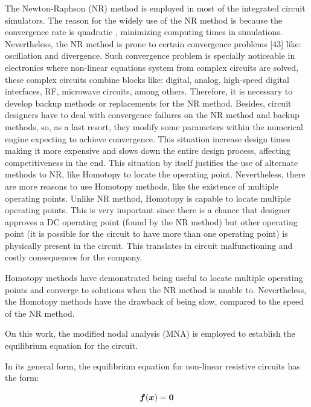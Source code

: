 \documentclass[conference,letterpaper,onecolumn,11pt]{IEEEtran}
\newcommand{\pig}[1]{\mbox{\boldmath ${#1}$}	}
\begin{document}
The Newton-Raphson (NR) method is employed in most of the integrated circuit simulators. The reason for the widely use of the NR method is because the convergence rate is quadratic \cite{cont_quasi}, minimizing computing times in simulations. Nevertheless, the NR method is prone to certain convergence problems [43] like: oscillation and divergence. Such convergence problem is specially noticeable in electronics where non-linear equations system from complex circuits are solved, these complex circuits combine blocks like: digital, analog, high-speed digital interfaces, RF, microwave circuits, among others. Therefore, it is necessary to develop backup methods or replacements for the NR method. Besides, circuit designers have to deal with convergence failures on the NR method and backup methods, so, as a last resort, they modify some parameters within the numerical engine expecting to achieve convergence. This situation increase design times making it more expensive and slows down the entire design process, affecting competitiveness in the end. This situation by itself justifies the use of alternate methods to NR, like Homotopy to locate the operating point. Nevertheless, there are more reasons to use Homotopy methods, like the existence of multiple operating points. Unlike NR method, Homotopy \cite{netwth_lasr,homo_iscas05,homo_ArtificialP} is capable to locate multiple operating points. This is very important since there is a chance that designer approves a DC operating point (found by the NR method) but other operating point (it is possible for the circuit to have more than one operating point) is physically present in the circuit. This translates in circuit malfunctioning and costly consequences for the company.

Homotopy methods \cite{cont_bra,cont_kao,cont_chu1,cont_leu11,cont_ritch} have demonstrated being useful to locate multiple operating points and converge to solutions when the NR method is unable to. Nevertheless, the Homotopy methods have the drawback of being slow, compared to the speed of the NR method.

On this work, the modified nodal analysis \cite{mnaxx,stat_1} (MNA) is employed to establish the equilibrium equation for the circuit.

In its general form, the equilibrium equation for non-linear resistive circuits has the form:

\begin{equation}
\pig{f}(\pig{x})=\pig{0}
\label{Fequilibrio3}
\end{equation}
\end{document}
